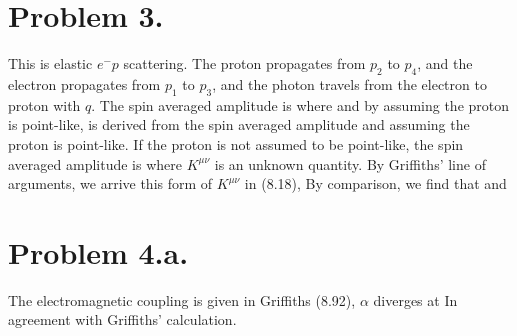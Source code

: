 \documentclass{article}
\begin{document}
\section*{Problem 3.}
This is elastic $e^{-}p$ scattering. The proton propagates from $p_2$ to $p_4$, and the electron propagates from $p_1$ to $p_3$, and the photon travels from the electron to proton with $q$. 
The spin averaged amplitude is
where
and by assuming the proton is point-like,
 is derived from the spin averaged amplitude and assuming the proton is point-like. If the proton is not assumed to be point-like, the spin averaged amplitude is
where $K^{\mu \nu}$ is an unknown quantity. By Griffiths' line of arguments, we arrive this form of $K^{\mu\nu}$ in (8.18),
By comparison, we find that
and 
\section*{Problem 4.a.}
The electromagnetic coupling is given in Griffiths (8.92),
$\alpha$ diverges at 
In agreement with Griffiths' calculation.
\end{document}

